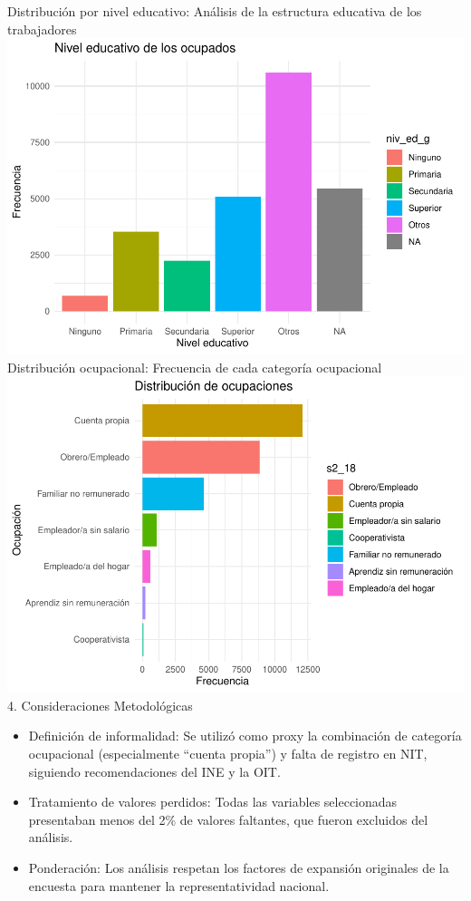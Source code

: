 \documentclass[Royal,times,sageh]{sagej}
\begin{document}
Distribución por nivel educativo: Análisis de la estructura educativa de
los trabajadores
\includegraphics{Articulo_files/figure-latex/unnamed-chunk-4-1.pdf}
Distribución ocupacional: Frecuencia de cada categoría ocupacional
\includegraphics{Articulo_files/figure-latex/unnamed-chunk-5-1.pdf} 4.
Consideraciones Metodológicas

\begin{itemize}
\item
  Definición de informalidad: Se utilizó como proxy la combinación de
  categoría ocupacional (especialmente ``cuenta propia'') y falta de
  registro en NIT, siguiendo recomendaciones del INE y la OIT.
\item
  Tratamiento de valores perdidos: Todas las variables seleccionadas
  presentaban menos del 2\% de valores faltantes, que fueron excluidos
  del análisis.
\item
  Ponderación: Los análisis respetan los factores de expansión
  originales de la encuesta para mantener la representatividad nacional.
\end{itemize}
\end{document}
